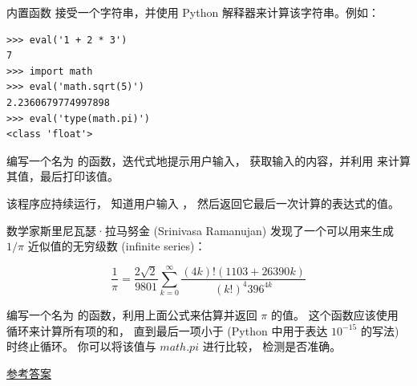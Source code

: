 \begin{exercise}
  


内置函数 {\em {}} 接受一个字符串，并使用 Python 解释器来计算该字符串。例如：

\begin{lstlisting}
>>> eval('1 + 2 * 3')
7
>>> import math
>>> eval('math.sqrt(5)')
2.2360679774997898
>>> eval('type(math.pi)')
<class 'float'>
\end{lstlisting}

%

编写一个名为 {\em {}} 的函数，迭代式地提示用户输入， 获取输入的内容，并利用 {\em {}} 来计算其值，最后打印该值。


该程序应持续运行， 知道用户输入 {\em {}}， 然后返回它最后一次计算的表达式的值。

\end{exercise}


\begin{exercise}


数学家斯里尼瓦瑟·拉马努金 (Srinivasa Ramanujan) 发现了一个可以用来生成 $1 / \pi$
近似值的无穷级数 (infinite series)：

\[ \frac{1}{\pi} = \frac{2\sqrt{2}}{9801}
\sum^\infty_{k=0} \frac{(4k)!(1103+26390k)}{(k!)^4 396^{4k}} \]


编写一个名为 {\em {}} 的函数，利用上面公式来估算并返回 $\pi$
的值。 这个函数应该使用  循环来计算所有项的和， 直到最后一项小于 {\em {}} (Python 中用于表达 $10^{-15}$ 的写法) 时终止循环。 你可以将该值与 $math.pi$ 进行比较， 检测是否准确。


\href{http://thinkpython2.com/code/pi.py}{参考答案}

\end{exercise}
